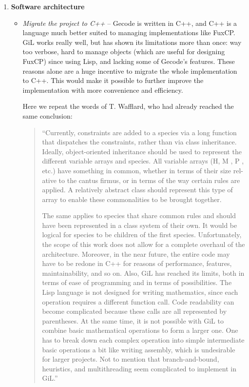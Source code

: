 \begin{enumerate}
  
  \item \textbf{Software architecture}
  \begin{itemize}
    \item \textit{Migrate the project to C++} -- Gecode is written in C++, and C++ is a language much better suited to managing implementations like FuxCP. GiL works really well, but has shown its limitations more than once: way too verbose, hard to manage objects (which are useful for designing FuxCP) since using Lisp, and lacking some of Gecode's features. These reasons alone are a huge incentive to migrate the whole implementation to C++. This would make it possible to further improve the implementation with more convenience and efficiency.
    
    Here we repeat the words of T. Wafflard, who had already reached the same conclusion:
    \begin{quotation}
      ``Currently, constraints are added to a species via a long function that dispatches the constraints, rather than via class inheritance. Ideally, object-oriented inheritance
      should be used to represent the different variable arrays and species. All variable arrays (H, M , P , etc.) have something in common, whether in terms of their size rel-
      ative to the cantus firmus, or in terms of the way certain rules are applied. A relatively abstract class should represent this type of array to enable these commonalities to be brought together.

      The same applies to species that share common rules and should have been represented in a class system of their own. It would be logical for species to be children of the first species. Unfortunately, the scope of this work does not allow for a complete overhaul of the architecture. Moreover, in the near future, the entire code may have to be redone in C++ for reasons of performance, features, maintainability, and so on.
      Also, GiL has reached its limits, both in terms of ease of programming and in terms of possibilities. The Lisp language is not designed for writing mathematics, since each operation requires a different function call. Code readability can become complicated because these calls are all represented by parentheses. At the same time, it is not possible with GiL to combine basic mathematical operations to form a larger one. One has to break down each complex operation into simple intermediate basic operations a bit like writing assembly, which is undesirable for larger projects. Not to mention that branch-and-bound, heuristics, and multithreading seem complicated to implement in
      GiL.'' \cite[p.67]{wafflard2023}
      \end{quotation}
  \end{itemize}


\end{enumerate}
